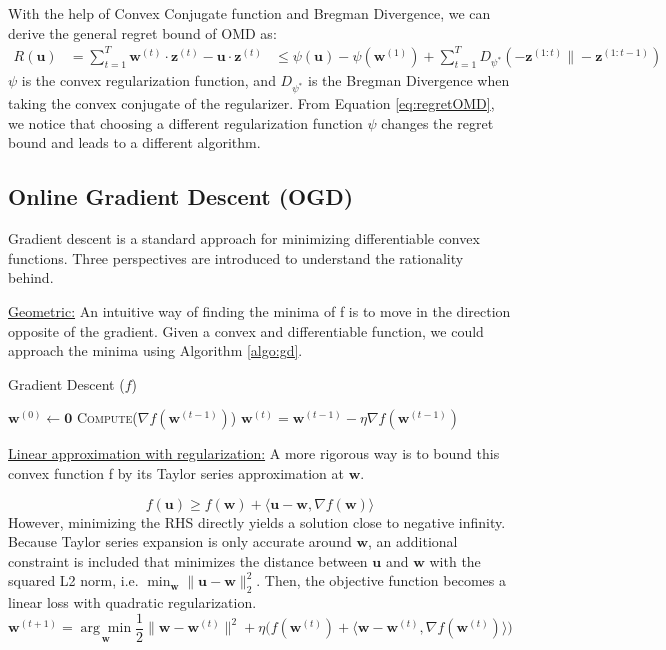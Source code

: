 \documentclass[11pt]{article}
\begin{document}
With the help of Convex Conjugate function and Bregman Divergence, we can derive the general regret bound of OMD as:
\begin{equation}
\begin{aligned}
R(\boldsymbol{u}) &=\sum_{t=1}^{T} \boldsymbol{w}^{(t)} \cdot \boldsymbol{z}^{(t)}-\boldsymbol{u} \cdot \boldsymbol{z}^{(t)} 
& \leq \psi(\boldsymbol{u})-\psi\left(\boldsymbol{w}^{(1)}\right)+\sum_{t=1}^{T} D_{\psi^{*}}\left(-\boldsymbol{z}^{(1: t)} \|-\boldsymbol{z}^{(1: t-1)}\right)
\end{aligned}
\label{eq:regretOMD}
\end{equation}
$\psi$ is the convex regularization function, and $D_{\psi^{*}}$ is the Bregman Divergence when taking the convex conjugate of the regularizer. From Equation \ref{eq:regretOMD}, we notice that choosing a different regularization function $\psi$ changes the regret bound and leads to a different algorithm.


\subsection{Online Gradient Descent (OGD)}
Gradient descent is a standard approach for minimizing differentiable convex functions. Three perspectives are introduced to understand the rationality behind.

\underline{Geometric:} An intuitive way of finding the minima of f is to move in the direction opposite of the gradient. Given a convex and differentiable function, we could approach the minima using Algorithm \ref{algo:gd}. 
\begin{algorithm}[H]
\caption{Gradient Descent ($f$)}
\label{algo:gd}
\begin{algorithmic}[1]
\STATE $\mathbf{w}^{(0)} \leftarrow \boldsymbol{0}$
\STATE \textsc{Compute}($\nabla f(\mathbf{w}^{(t-1)})$)
\STATE $\mathbf{w}^{(t)} = \mathbf{w}^{(t-1)} - \eta \nabla f(\mathbf{w}^{(t-1)})$
\ENDFOR
\end{algorithmic}
\end{algorithm}
\underline{Linear approximation with regularization:} A more rigorous way is to bound this convex function f by its Taylor series approximation at $\mathbf{w}$. 

\begin{equation*}
f(\mathbf{u}) \geq f(\mathbf{w}) + \langle \mathbf{u}-\mathbf{w}, \nabla f(\mathbf{w}) \rangle
\end{equation*}
However, minimizing the RHS directly yields a solution close to negative infinity. Because Taylor series expansion is only accurate around $\mathbf{w}$, an additional constraint is included that minimizes the distance between $\mathbf{u}$ and $\mathbf{w}$ with the squared L2 norm, i.e. $\min_{\mathbf{w}}\| \mathbf{u} - \mathbf{w} \|_2^2$.  Then, the objective function becomes a linear loss with quadratic regularization.
\begin{equation*}
\mathbf{w}^{(t+1)} = 
\underset{\mathbf{w}}{\arg\min} \frac{1}{2} \| \mathbf{w} - \mathbf{w}^{(t)} \|^2 
+ \eta\Big(f(\mathbf{w}^{(t)}) + \langle \mathbf{w}-\mathbf{w}^{(t)}, \nabla f(\mathbf{w}^{(t)}) \rangle \Big)
\end{equation*}
\end{document}
